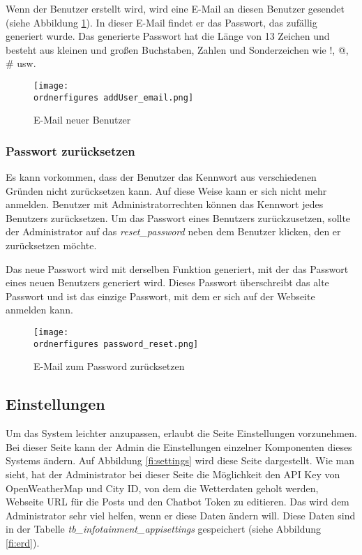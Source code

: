 Wenn der Benutzer erstellt wird, wird eine E-Mail an diesen Benutzer gesendet (siehe Abbildung \ref{fi:addUser_email}). In dieser E-Mail findet er das Passwort, das zufällig generiert wurde. Das generierte Passwort hat die Länge von 13 Zeichen und besteht aus kleinen und großen Buchstaben, Zahlen und Sonderzeichen wie !, @, \# usw.
\begin{figure}[H]
	\centering
	\texttt{[image: \\ordnerfigures addUser\_email.png]}
	\caption{E-Mail neuer Benutzer }
	\label{fi:addUser_email}
\end{figure}


\subsubsection{Passwort zurücksetzen}

Es kann vorkommen, dass der Benutzer das Kennwort aus verschiedenen Gründen nicht zurücksetzen kann. Auf diese Weise kann er sich nicht mehr anmelden. Benutzer mit Administratorrechten können das Kennwort jedes Benutzers zurücksetzen. Um das Passwort eines Benutzers zurückzusetzen, sollte der Administrator auf das \textit{reset\_password} neben dem Benutzer klicken, den er zurücksetzen möchte.

Das neue Passwort wird mit derselben Funktion generiert, mit der das Passwort eines neuen Benutzers generiert wird. Dieses Passwort überschreibt das alte Passwort und ist das einzige Passwort, mit dem er sich auf der Webseite anmelden kann.

\begin{figure}[H]
	\centering
	\texttt{[image: \\ordnerfigures password\_reset.png]}
	\caption{E-Mail zum Password zurücksetzen}
	\label{fi:password_reset}
\end{figure}


\subsection{Einstellungen}
Um das System leichter anzupassen, erlaubt die Seite Einstellungen vorzunehmen. Bei dieser Seite kann der Admin die Einstellungen einzelner Komponenten dieses Systems ändern. Auf Abbildung \ref{fi:settings} wird diese Seite dargestellt. Wie man sieht, hat der Administrator bei dieser Seite die Möglichkeit den API Key von OpenWeatherMap und City ID, von dem die Wetterdaten geholt werden, Webseite URL für die Posts und den Chatbot Token zu editieren. Das wird dem Administrator sehr viel helfen, wenn er diese Daten ändern will. Diese Daten sind in der Tabelle \textit{tb\_infotainment\_appisettings} gespeichert (siehe Abbildung \ref{fi:erd}).

